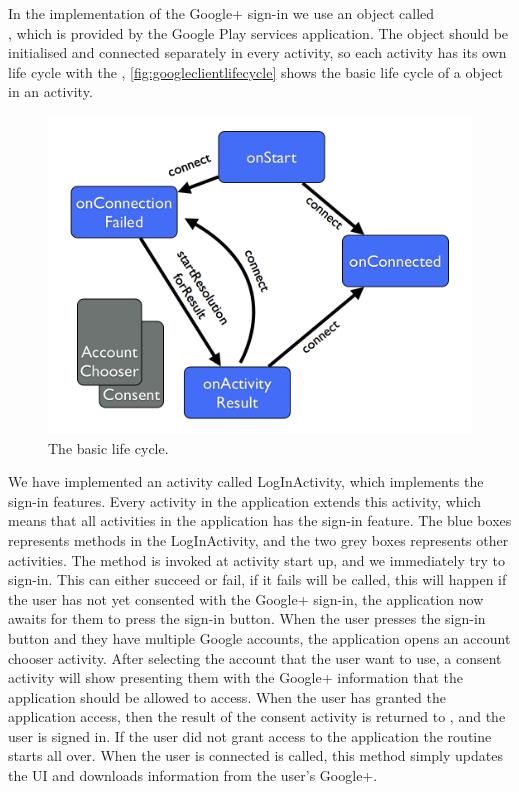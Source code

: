 In the implementation of the Google+ sign-in we use an object called \\\citep{googleapiclient-docs}, which is provided by the Google Play services application. 
The object  should be initialised and connected separately in every activity, so each activity has its own life cycle with the , \autoref{fig:googleclientlifecycle} shows the basic life cycle of a  object in an activity.
\begin{figure}[H]
\centering
\includegraphics[width=0.75\linewidth]{img/googleclientflow.png}
\caption{The  basic life cycle\cite{googleapiclient-lifecycle}.}
\label{fig:googleclientlifecycle}
\end{figure}
We have implemented an activity called LogInActivity, which implements the sign-in features. Every activity in the application extends this activity, which means that all activities in the application has the sign-in feature. 
The blue boxes represents methods in the LogInActivity, and the two grey boxes represents other activities. The method  is invoked at activity start up, and we immediately try to sign-in. 
This can either succeed or fail, if it fails  will be called, this will happen if the user has not yet consented with the Google+ sign-in, the application now awaits for them to press the sign-in button. 
When the user presses the sign-in button and they have multiple Google accounts, the application opens an account chooser activity.
After selecting the account that the user want to use, a consent activity will show presenting them with the Google+ information that the application should be allowed to access. 
When the user has granted the application access, then the result of the consent activity is returned to , and the user is signed in. 
If the user did not grant access to the application the routine starts all over. When the user is connected  is called, this method simply updates the UI and downloads information from the user's Google+.

